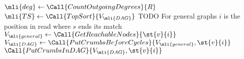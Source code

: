 \begin{algorithm}[t]
\begin{algorithmic}[1]
		\Statex
			\State $\mli{deg} \gets \Call{CountOutgoingDegrees}{R}$
			\State $\mli{TS} \gets \Call{TopSort}{V_\mli{DAG}}$
			\State TODO
		\EndFunction
		\Statex
		\Comment For general graphs
		\Comment $i$ is the position in read where $s$ ends its match
			\State $V_\mli{general} \gets \Call{GetReachableNodes}{\st{v}{i}}$
			\State $V_\mli{DAG} \gets \Call{PutCrumbsBeforeCycles}{V_\mli{general}, \st{v}{i}}$
			\State $\Call{PutCrumbsInDAG}{V_\mli{DAG}, \st{v}{i}}$
		\EndFunction
		\Statex
	\end{algorithmic}
\end{algorithm}
